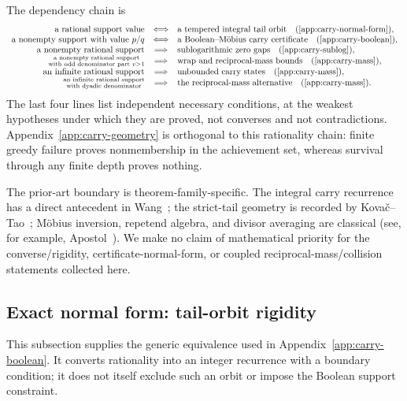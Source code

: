 \documentclass[11pt]{article}
\theoremstyle{definition}
\theoremstyle{remark}
\begin{document}
The dependency chain is
{\setlength{\arraycolsep}{3.5pt}
\[
\begin{array}{rcl}
 \text{a rational support value}
 &\Longleftrightarrow& \text{a tempered integral tail orbit}
 \quad\text{(\ref{app:carry-normal-form})},\\
 \text{a nonempty support with value \(p/q\)}
 &\Longleftrightarrow& \text{a Boolean--M\"obius carry certificate}
 \quad\text{(\ref{app:carry-boolean})},\\
 \text{a nonempty rational support}
 &\Longrightarrow& \text{sublogarithmic zero gaps}\quad\text{(\ref{app:carry-sublog})},\\
 \substack{\text{a nonempty rational support}\\
 \text{with odd denominator part }v>1}
 &\Longrightarrow& \text{wrap and reciprocal-mass bounds}
 \quad\text{(\ref{app:carry-mass})},\\
 \text{an infinite rational support}
 &\Longrightarrow& \text{unbounded carry states}
 \quad\text{(\ref{app:carry-mass})},\\
 \substack{\text{an infinite rational support}\\
 \text{with dyadic denominator}}
 &\Longrightarrow& \text{the reciprocal-mass alternative}
 \quad\text{(\ref{app:carry-mass}).}
\end{array}
\]
}
The last four lines list independent necessary conditions, at the weakest
hypotheses under which they are proved, not converses and not
contradictions.  Appendix~\ref{app:carry-geometry} is orthogonal to this
rationality chain:
finite greedy failure proves nonmembership in the achievement set, whereas
survival through any finite depth proves nothing.

The prior-art boundary is theorem-family-specific. The integral carry
recurrence has a direct antecedent in Wang~\cite[Section~3]{wang2026};
the strict-tail geometry is recorded by Kova\v{c}--Tao~\cite[Remark~4.1]{kovactao};
M\"obius inversion, repetend algebra, and divisor averaging are classical
(see, for example, Apostol~\cite{apostol}). We make no claim of mathematical
priority for the converse/rigidity, certificate-normal-form, or coupled
reciprocal-mass/collision statements collected here.

\subsection{Exact normal form: tail-orbit rigidity}
\label{app:carry-normal-form}

This subsection supplies the generic equivalence used in
Appendix~\ref{app:carry-boolean}.
It converts rationality into an integer recurrence with a boundary condition;
it does not itself exclude such an orbit or impose the Boolean support
constraint.
\end{document}

